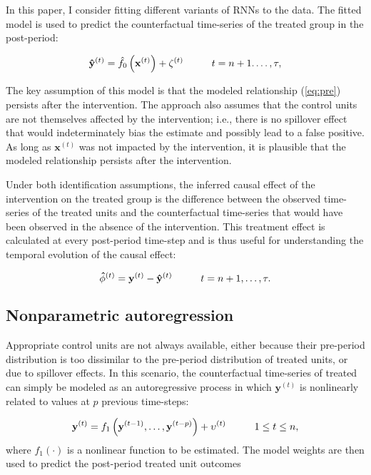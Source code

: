 \documentclass[hidelinks,12pt]{article}
\begin{document}
In this paper, I consider fitting different variants of RNNs to the data. The fitted model is used to predict the counterfactual time-series of the treated group in the post-period: 

\begin{equation}\label{eq:post}
  \mathbf{\hat{y}}^{(t)} =  \hat{f_0} \left(\mathbf{x}^{(t)}\right) + \zeta^{(t)}  \hspace{10mm} t = n+1. \ldots, \tau, 
\end{equation}

The key assumption of this model is that the modeled relationship (\ref{eq:pre}) persists after the intervention. The approach also assumes that the control units are not themselves affected by the intervention; i.e., there is no spillover effect that would indeterminately bias the estimate and possibly lead to a false positive. As long as $\mathbf{x}^{(t)}$ was not impacted by the intervention, it is plausible that the modeled relationship persists after the intervention. 

Under both identification assumptions, the inferred causal effect of the intervention on the treated group is the difference between the observed time-series of the treated units and the counterfactual time-series that would have been observed in the absence of the intervention. This treatment effect is calculated at every post-period time-step and is thus useful for understanding the temporal evolution of the causal effect:

\begin{equation}\label{eq:pointwise}
  \mathbf{\hat{\phi}}^{(t)} = \mathbf{y}^{(t)} - \mathbf{\hat{y}}^{(t)} \hspace{10mm} t = n+1, \ldots, \tau. 
\end{equation}

\subsection{Nonparametric autoregression}

Appropriate control units are not always available, either because their pre-period distribution is too dissimilar to the pre-period distribution of treated units, or due to spillover effects. In this scenario, the counterfactual time-series of treated can simply be modeled as an autoregressive process in which $\mathbf{y}^{(t)}$ is nonlinearly related to values at $p$ previous time-steps:

\begin{equation}\label{eq:ar-pre}
\mathbf{y}^{(t)} =  f_1 \left(\mathbf{y}^{(t-1)}, \ldots, \mathbf{y}^{(t-p)}\right) + \upsilon^{(t)} \hspace{10mm} 1 \leq t \leq n, 
\end{equation} %
\noindent
where $f_1 (\cdot)$ is a nonlinear function to be estimated. The model weights are then used to predict the post-period treated unit outcomes
\end{document}
